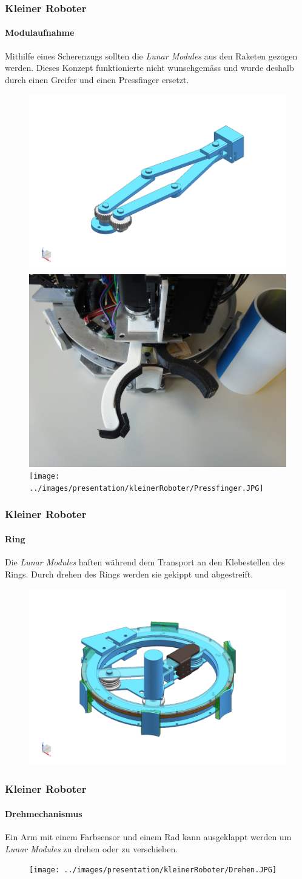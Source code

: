 \begin{frame}
	\frametitle{Kleiner Roboter}
	\framesubtitle{Modulaufnahme}
	Mithilfe eines Scherenzugs sollten die \textit{Lunar Modules} aus den Raketen gezogen werden.
	Dieses Konzept funktionierte nicht wunschgemäss und wurde deshalb durch einen Greifer und einen Pressfinger ersetzt.\\
	
	\begin{figure}
		\includegraphics[height = 3 cm]{../images/presentation/kleinerRoboter/Schere.png}
		\hspace{1em}
		\includegraphics[height = 3 cm]{../images/presentation/kleinerRoboter/Greifer.JPG}
		\hspace{2em}
		\texttt{[image: ../images/presentation/kleinerRoboter/Pressfinger.JPG]}
	\end{figure}
\end{frame}

\begin{frame}
	\frametitle{Kleiner Roboter}
	\framesubtitle{Ring}
	Die \textit{Lunar Modules} haften während dem Transport an den Klebestellen des Rings.
	Durch drehen des Rings werden sie gekippt und abgestreift.
	\begin{figure}
		\centering
		\includegraphics[height = 4 cm]{../images/presentation/kleinerRoboter/Ring.png}
	\end{figure}
\end{frame}

\begin{frame}
	\frametitle{Kleiner Roboter}
	\framesubtitle{Drehmechanismus}
	Ein Arm mit einem Farbsensor und einem Rad kann ausgeklappt werden um \textit{Lunar Modules} zu drehen oder zu verschieben.
	\begin{figure}
		\centering
		\texttt{[image: ../images/presentation/kleinerRoboter/Drehen.JPG]}
	\end{figure}
\end{frame}